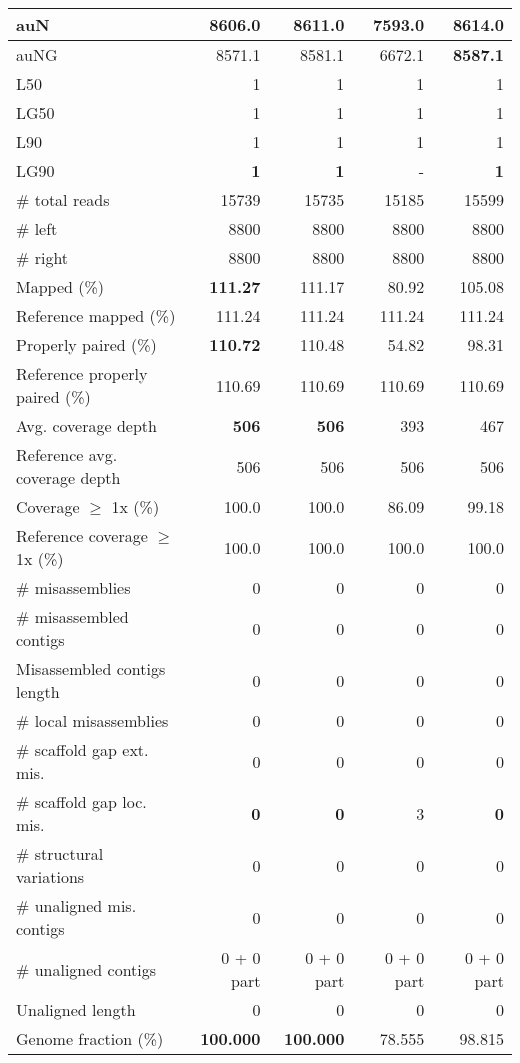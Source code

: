 \documentclass[12pt,a4paper]{article}
\begin{document}
\begin{table}[ht]
\begin{center}
\begin{tabular}{|l*{4}{|r}|}
auN & 8606.0 & 8611.0 & 7593.0 & {\bf 8614.0} \\ \hline
auNG & 8571.1 & 8581.1 & 6672.1 & {\bf 8587.1} \\ \hline
L50 & 1 & 1 & 1 & 1 \\ \hline
LG50 & 1 & 1 & 1 & 1 \\ \hline
L90 & 1 & 1 & 1 & 1 \\ \hline
LG90 & {\bf 1} & {\bf 1} & - & {\bf 1} \\ \hline
\# total reads & 15739 & 15735 & 15185 & 15599 \\ \hline
\# left & 8800 & 8800 & 8800 & 8800 \\ \hline
\# right & 8800 & 8800 & 8800 & 8800 \\ \hline
Mapped (\%) & {\bf 111.27} & 111.17 & 80.92 & 105.08 \\ \hline
Reference mapped (\%) & 111.24 & 111.24 & 111.24 & 111.24 \\ \hline
Properly paired (\%) & {\bf 110.72} & 110.48 & 54.82 & 98.31 \\ \hline
Reference properly paired (\%) & 110.69 & 110.69 & 110.69 & 110.69 \\ \hline
Avg. coverage depth & {\bf 506} & {\bf 506} & 393 & 467 \\ \hline
Reference avg. coverage depth & 506 & 506 & 506 & 506 \\ \hline
Coverage $\geq$ 1x (\%) & 100.0 & 100.0 & 86.09 & 99.18 \\ \hline
Reference coverage $\geq$ 1x (\%) & 100.0 & 100.0 & 100.0 & 100.0 \\ \hline
\# misassemblies & 0 & 0 & 0 & 0 \\ \hline
\# misassembled contigs & 0 & 0 & 0 & 0 \\ \hline
Misassembled contigs length & 0 & 0 & 0 & 0 \\ \hline
\# local misassemblies & 0 & 0 & 0 & 0 \\ \hline
\# scaffold gap ext. mis. & 0 & 0 & 0 & 0 \\ \hline
\# scaffold gap loc. mis. & {\bf 0} & {\bf 0} & 3 & {\bf 0} \\ \hline
\# structural variations & 0 & 0 & 0 & 0 \\ \hline
\# unaligned mis. contigs & 0 & 0 & 0 & 0 \\ \hline
\# unaligned contigs & 0 + 0 part & 0 + 0 part & 0 + 0 part & 0 + 0 part \\ \hline
Unaligned length & 0 & 0 & 0 & 0 \\ \hline
Genome fraction (\%) & {\bf 100.000} & {\bf 100.000} & 78.555 & 98.815 \\ \hline

\end{tabular}
\end{center}
\end{table}
\end{document}
